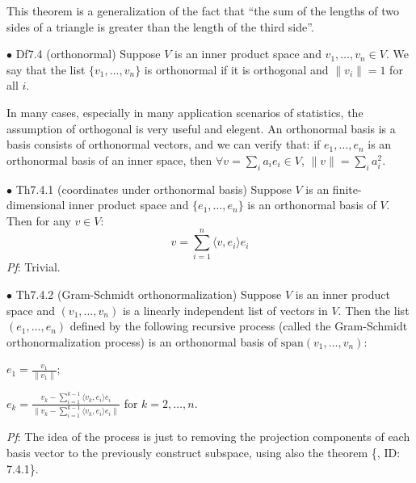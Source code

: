 \documentclass{article}
\begin{document}
\begin{Rmk}{}
    This theorem is a generalization of the fact that ``the sum of the lengths of two sides of a triangle is greater than the length of the third side''.
\end{Rmk}

\begin{Df}{$\bullet$ Df7.4 (orthonormal)}
    Suppose $V$ is an inner product space and $v_1, \dots, v_n\in V$. We say that the list $\{v_1, \dots, v_n\}$ is orthonormal if it is orthogonal and $\|v_i\| = 1$ for all $i$.
\end{Df}

\begin{Rmk}{}
    In many cases, especially in many application scenarios of statistics, the assumption of orthogonal is very useful and elegent. \textcolor{Df}{An orthonormal basis is a basis consists of orthonormal vectors}, and we can verify that: \textcolor{Th}{if $e_1, \dots, e_n$ is an orthonormal basis of an inner space, then $\forall v = \sum_{i} a_i e_i\in V$, $\|v\| = \sum_{i}a_i^2$.} 
\end{Rmk}

\begin{Th}{$\bullet$ Th7.4.1 (coordinates under orthonormal basis)}
    Suppose $V$ is an finite-dimensional inner product space and $\{e_1, \dots, e_n\}$ is an orthonormal basis of $V$. Then for any $v\in V$:
    $$v = \sum_{i=1}^{n}\langle v,e_i\rangle e_i$$
    \tcblower
    \textit{Pf}: Trivial.
\end{Th}

\begin{Th}{$\bullet$ Th7.4.2 (Gram-Schmidt orthonormalization)}
    Suppose $V$ is an inner product space and $(v_1, \dots, v_n)$ is a linearly independent list of vectors in $V$. Then the list $(e_1, \dots, e_n)$ defined by the following recursive process (called the Gram-Schmidt orthonormalization process) is an orthonormal basis of $\text{span}(v_1, \dots, v_n)$:
    \begin{compactenum}
        \item $e_1 = \frac{v_1}{\|v_1\|}$;
        \item $e_k = \frac{v_k - \sum_{i=1}^{k-1}\langle v_k, e_i\rangle e_i}{\|v_k - \sum_{i=1}^{k-1}\langle v_k, e_i\rangle e_i\|}$ for $k=2, \dots, n$.
    \end{compactenum}
    \tcblower
    \textit{Pf}: The idea of the process is just to removing the projection components of each basis vector to the previously construct subspace, using also the theorem \{, ID: 7.4.1\}.
\end{Th}
\end{document}
